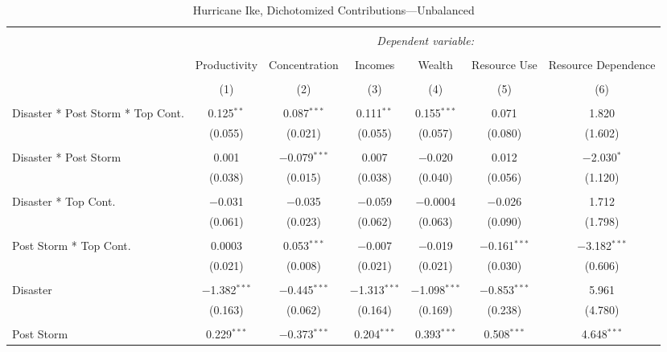 
\begin{table}[!htbp] \centering 
  \caption{Hurricane Ike, Dichotomized Contributions---Unbalanced} 
  \label{} 
\footnotesize 
\begin{tabular}{@{\extracolsep{5pt}}lcccccc} 
\\[-1.8ex]\hline 
\hline \\[-1.8ex] 
 & \multicolumn{6}{c}{\textit{Dependent variable:}} \\ 
\cline{2-7} 
\\[-1.8ex] & Productivity & Concentration & Incomes & Wealth & Resource Use & Resource Dependence \\ 
\\[-1.8ex] & (1) & (2) & (3) & (4) & (5) & (6)\\ 
\hline \\[-1.8ex] 
 Disaster * Post Storm * Top Cont. & 0.125$^{**}$ & 0.087$^{***}$ & 0.111$^{**}$ & 0.155$^{***}$ & 0.071 & 1.820 \\ 
  & (0.055) & (0.021) & (0.055) & (0.057) & (0.080) & (1.602) \\ 
  & & & & & & \\ 
 Disaster * Post Storm & 0.001 & $-$0.079$^{***}$ & 0.007 & $-$0.020 & 0.012 & $-$2.030$^{*}$ \\ 
  & (0.038) & (0.015) & (0.038) & (0.040) & (0.056) & (1.120) \\ 
  & & & & & & \\ 
 Disaster * Top Cont. & $-$0.031 & $-$0.035 & $-$0.059 & $-$0.0004 & $-$0.026 & 1.712 \\ 
  & (0.061) & (0.023) & (0.062) & (0.063) & (0.090) & (1.798) \\ 
  & & & & & & \\ 
 Post Storm *  Top Cont. & 0.0003 & 0.053$^{***}$ & $-$0.007 & $-$0.019 & $-$0.161$^{***}$ & $-$3.182$^{***}$ \\ 
  & (0.021) & (0.008) & (0.021) & (0.021) & (0.030) & (0.606) \\ 
  & & & & & & \\ 
 Disaster & $-$1.382$^{***}$ & $-$0.445$^{***}$ & $-$1.313$^{***}$ & $-$1.098$^{***}$ & $-$0.853$^{***}$ & 5.961 \\ 
  & (0.163) & (0.062) & (0.164) & (0.169) & (0.238) & (4.780) \\ 
  & & & & & & \\ 
 Post Storm & 0.229$^{***}$ & $-$0.373$^{***}$ & 0.204$^{***}$ & 0.393$^{***}$ & 0.508$^{***}$ & 4.648$^{***}$ \\ 

\end{tabular}
\end{table}
